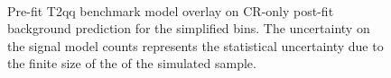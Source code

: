 \begin{figure}[!h]
    \centering
     \\
    \caption{
        Pre-fit T2qq benchmark model overlay on CR-only post-fit
        background prediction for the simplified bins. The uncertainty on
        the signal model counts represents the statistical uncertainty due
        to the finite size of the of the simulated sample.
    }
    \label{fig:T2qq_8fold_MR_simp}
\end{figure}

